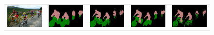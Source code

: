 \begin{figure}[!t]
  \centering
  \scalebox{0.85} {
  \begin{tabular}{c @{\hskip 5pt} c @{\hskip 5pt} c @{\hskip 5pt} c @{\hskip 5pt} c}


    \includegraphics[width=0.21\linewidth]{fig/res_vs_vgg/resnet101_noup_pool3_14/img/2007_001311.jpg} &
    \includegraphics[width=0.21\linewidth]{fig/res_vs_vgg/vgg128_noup_pool3_20M_largewin3_newcode5/res_none/2007_001311.png} &
    \includegraphics[width=0.21\linewidth]{fig/res_vs_vgg/vgg128_noup_pool3_20M_largewin3_newcode5/res_crf/2007_001311.png} &
    \includegraphics[width=0.21\linewidth]{fig/res_vs_vgg/resnet101_noup_pool3_14/res_none/2007_001311.png} &
    \includegraphics[width=0.21\linewidth]{fig/res_vs_vgg/resnet101_noup_pool3_14/res_crf/2007_001311.png} \\


\end{tabular}}
\end{figure}
